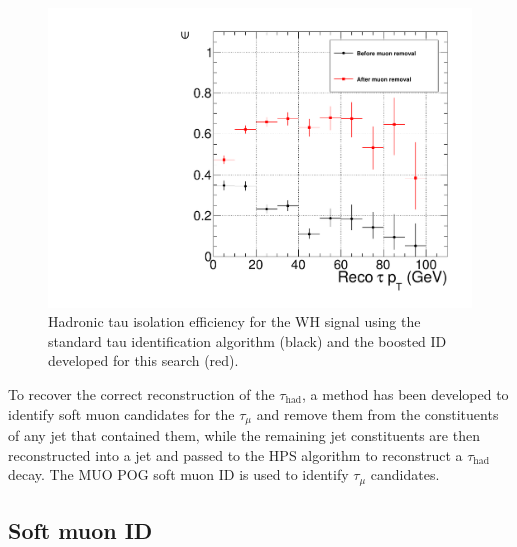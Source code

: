\begin{figure}[hbtp]
  \begin{center}
    \includegraphics[width=\cmsFigWidth]{figures/effVsPT_MCTruthMuonRemoval_LooseCombinedIsolationDBSumPtCorr_canvas}
    \caption{Hadronic tau isolation efficiency for the WH signal using the standard tau identification algorithm (black) and the boosted ID developed for this search (red).}
    \label{fig:evt-sel-HPS-iso-eff-standard-vs-boosted-ID}
  \end{center}
\end{figure}

To recover the correct reconstruction of the $\tau_{\text{had}}$, a method has been developed to identify soft muon candidates for the $\tau_{\mu}$ and remove them from the constituents of any jet that contained them, while the remaining jet constituents are then reconstructed into a jet and passed to the HPS algorithm to reconstruct a $\tau_{\text{had}}$ decay. The MUO POG soft muon ID is used to identify $\tau_{\mu}$ candidates.

\subsection{Soft muon ID\label{sec:evtsel-softmu}}

